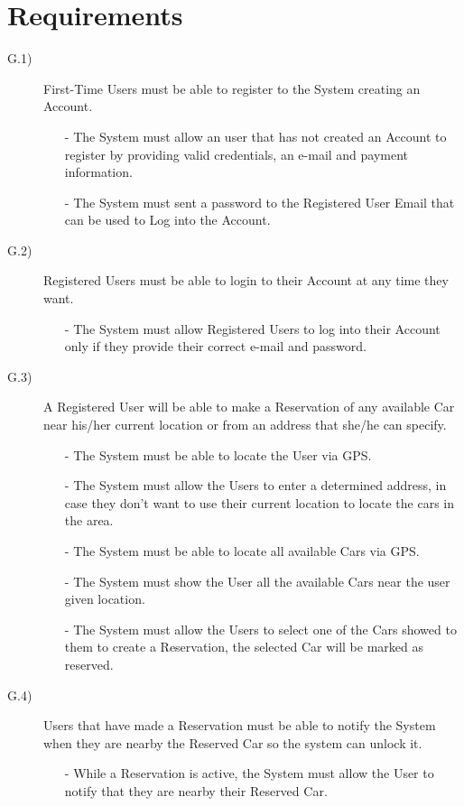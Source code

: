 \documentclass[a4paper]{article}
\begin{document}
\section{Requirements}
\begin{description}
\item [G.1)]First-Time Users must be able to register to the System creating an Account. 
\begin{itemize}
	\item[-]The System must allow an user that has not created an Account to register by providing valid credentials, an e-mail and payment information.
	\item[-]The System must sent a password to the Registered User Email that can be used to Log into the Account.
\end{itemize}
\item [G.2)]Registered Users must be able to login to their Account at any time they want.
\begin{itemize}
	\item[-]The System must allow Registered Users to log into their Account only if they provide their correct e-mail and password.
\end{itemize}
\item [G.3)]A Registered User will be able to make a Reservation of any available Car near his/her current location or from an address that she/he can specify.
\begin{itemize}
	\item[-]The System must be able to locate the User via GPS.
	\item[-]The System must allow the Users to enter a determined address, in case they don't want to use their current location to locate the cars in the area.
	\item[-]The System must be able to locate all available Cars via GPS.
	\item[-]The System must show the User all the available Cars near the user given location.
	\item[-]The System must allow the Users to select one of the Cars showed to them to create a Reservation, the selected Car will be marked as reserved.
\end{itemize}
\item [G.4)]Users that have made a Reservation must be able to notify the System when they are nearby the Reserved Car so the system can unlock it.
\begin{itemize}
	\item[-]While a Reservation is active, the System must allow the User to notify that they are nearby their Reserved Car.

\end{itemize}
\end{description}
\end{document}
